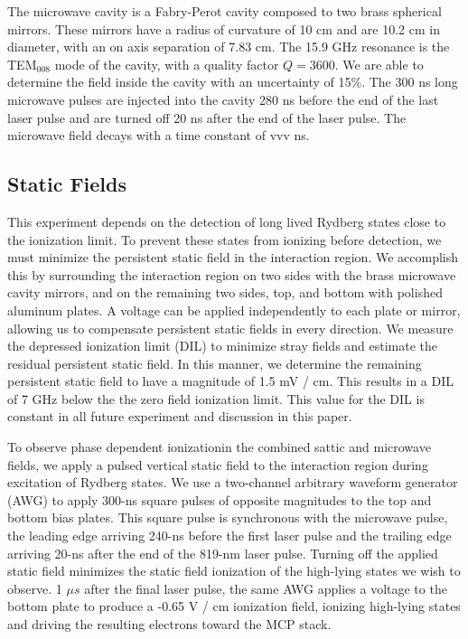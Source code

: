 \documentclass[aps,pra,preprint,groupedaddress]{revtex4-1}
\begin{document}
The microwave cavity is a Fabry-Perot cavity composed to two brass spherical mirrors. These mirrors have a radius of curvature of 10 cm and are 10.2 cm in diameter, with an on axis separation of 7.83 cm. The 15.9 GHz resonance is the TEM$_{008}$ mode of the cavity, with a quality factor $Q=3600$. We are able to determine the field inside the cavity with an uncertainty of 15\%. The 300 ns long microwave pulses are injected into the cavity 280 ns before the end of the last laser pulse and are turned off 20 ns after the end of the laser pulse. The microwave field decays with a time constant of vvv ns.

\subsection{\label{fields} Static Fields}

This experiment depends on the detection of long lived Rydberg states close to the ionization limit. To prevent these states from ionizing before detection, we must minimize the persistent static field in the interaction region. We accomplish this by surrounding the interaction region on two sides with the brass microwave cavity mirrors, and on the remaining two sides, top, and bottom with polished aluminum plates. A voltage can be applied independently to each plate or mirror, allowing us to compensate persistent static fields in every direction. We measure the depressed ionization limit (DIL) to minimize stray fields and estimate the residual persistent static field. In this manner, we determine the remaining persistent static field to have a magnitude of 1.5 mV / cm. This results in a DIL of 7 GHz below the the zero field ionization limit. This value for the DIL is constant in all future experiment and discussion in this paper.

To observe phase dependent ionizationin the combined sattic and microwave fields, we apply a pulsed vertical static field to the interaction region during excitation of Rydberg states. We use a two-channel arbitrary waveform generator (AWG) to apply 300-ns square pulses of opposite magnitudes to the top and bottom bias plates. This square pulse is synchronous with the microwave pulse, the leading edge arriving 240-ns before the first laser pulse and the trailing edge arriving 20-ns after the end of the 819-nm laser pulse. Turning off the applied static field minimizes the static field ionization of the high-lying states we wish to observe. 1 $\mu s$ after the final laser pulse, the same AWG applies a voltage to the bottom plate to produce a -0.65 V / cm ionization field, ionizing high-lying states and driving the resulting electrons toward the MCP stack.
\end{document}

